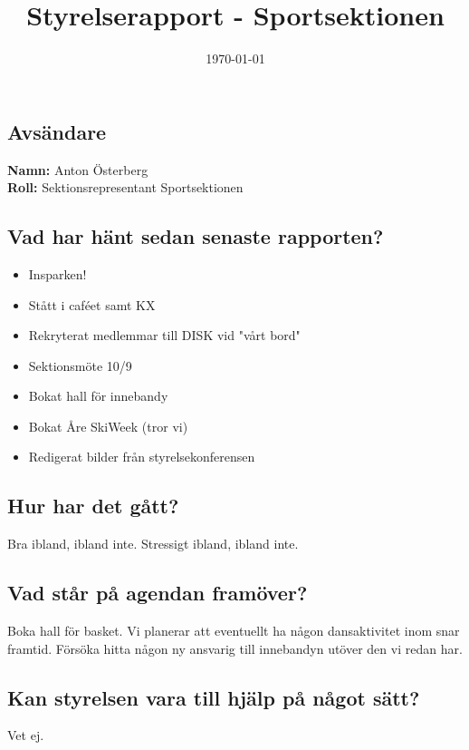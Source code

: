 \documentclass[a4paper]{article}
\begin{document}
	\title{Styrelserapport - Sportsektionen}
	\date{\today}
	\maketitle

	\subsection{Avsändare}
		\textbf{Namn:} Anton Österberg\\
		\textbf{Roll:} Sektionsrepresentant Sportsektionen\\
	\subsection{Vad har hänt sedan senaste rapporten?}
	\begin{itemize}
		\item Insparken!
		\item Stått i caféet samt KX
		\item Rekryterat medlemmar till DISK vid "vårt bord"
		\item Sektionsmöte 10/9
		\item Bokat hall för innebandy
		\item Bokat Åre SkiWeek (tror vi)
		\item Redigerat bilder från styrelsekonferensen
	\end{itemize}
	\subsection{Hur har det gått?}
	Bra ibland, ibland inte. Stressigt ibland, ibland inte.
	\subsection{Vad står på agendan framöver?}
	Boka hall för basket. Vi planerar att eventuellt ha någon dansaktivitet inom snar framtid. Försöka hitta någon ny ansvarig till innebandyn utöver den vi redan har.
	\subsection{Kan styrelsen vara till hjälp på något sätt?}
	Vet ej.
\end{document}

